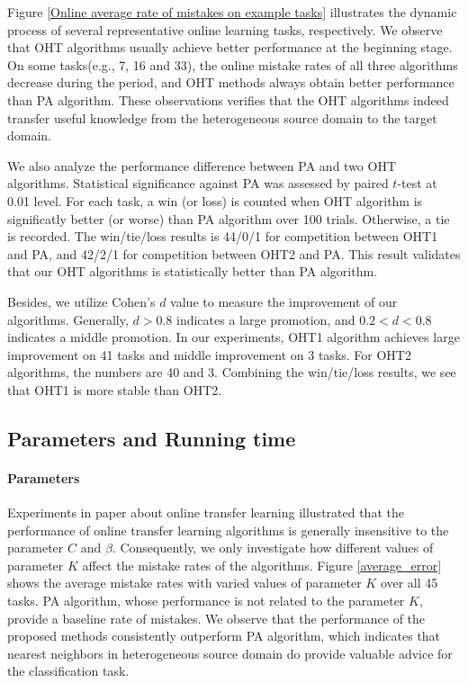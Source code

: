 \documentclass[letterpaper]{article}
\begin{document}
Figure \ref{Online average rate of mistakes on example tasks} illustrates the dynamic process of several representative online learning tasks, respectively.
We observe that OHT algorithms usually achieve better performance at the beginning stage.
On some tasks(e.g., 7, 16 and 33), the online mistake rates of all three algorithms decrease during the period, and OHT methods always obtain better performance than PA algorithm.
These observations verifies that the OHT algorithms indeed transfer useful knowledge from the heterogeneous source domain to the target domain. 

We also analyze the performance difference between PA and two OHT algorithms.
Statistical significance against PA was assessed by paired $t$-test at 0.01 level.
For each task, a win (or loss) is counted when OHT algorithm is significatly better (or worse) than PA algorithm over 100 trials.
Otherwise, a tie is recorded.
The win/tie/loss results is 44/0/1 for competition between OHT1 and PA, and 42/2/1 for competition between  OHT2 and PA.
This result validates that our OHT algorithms is statistically better than PA algorithm.

Besides, we utilize Cohen's $d$ value to measure the improvement of our algorithms.
Generally, $d>0.8$ indicates a large promotion, and $0.2<d<0.8$ indicates a middle promotion.
In our experiments, OHT1 algorithm achieves large improvement on 41 tasks and middle improvement on 3 tasks.
For OHT2 algorithms, the numbers are 40 and 3.
Combining the win/tie/loss results, we see that OHT1 is more stable than OHT2.


\subsection{Parameters and Running time}
\paragraph{Parameters}
Experiments in paper about online transfer learning illustrated that the performance of online transfer learning algorithms is generally insensitive to the parameter $C$ and $\beta$.
Consequently, we only investigate how different values of parameter $K$ affect the mistake rates of the algorithms.
Figure \ref{average_error} shows the average mistake rates with varied values of parameter $K$ over all 45 tasks.
PA algorithm, whose performance is not related to the parameter $K$, provide a baseline rate of mistakes.
We observe that the performance of the proposed methods consistently outperform PA algorithm, which indicates that nearest neighbors in heterogeneous source domain do provide valuable advice for the classification task.
\end{document}
